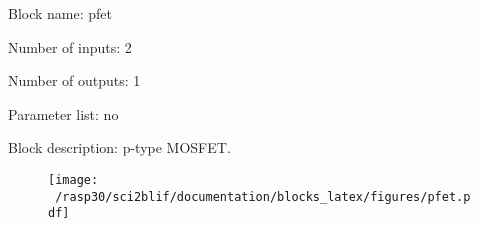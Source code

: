 \pagebreak
Block name: pfet

Number of inputs: 2

Number of outputs: 1

Parameter list: no

Block description: 
p-type MOSFET.

\begin{figure}[H]  %
\texttt{[image: ~/rasp30/sci2blif/documentation/blocks\_latex/figures/pfet.pdf]}
\end{figure}


